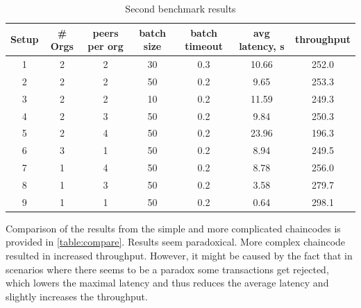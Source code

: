 \begin{table}[h!]
\begin{center}
\begin{tabular}{ c|c|c|c|c|c|c }
  Setup & \# Orgs & peers per org & batch size & batch timeout & avg latency, s & throughput \\
 \hline
 \hline
 1 & 2 & 2 & 30 & 0.3 & 10.66 & 252.0 \\
 \hline
 2 & 2 & 2 & 50 & 0.2 & 9.65 & 253.3 \\
 \hline
 3 & 2 & 2 & 10 & 0.2 & 11.59 & 249.3 \\
 \hline
 4 & 2 & 3 & 50 & 0.2 & 9.84 & 250.3 \\
 \hline
 5 & 2 & 4 & 50 & 0.2 & 23.96 & 196.3 \\
 \hline
 6 & 3 & 1 & 50 & 0.2 & 8.94 & 249.5 \\
 \hline
 7 & 1 & 4 & 50 & 0.2 & 8.78 & 256.0 \\
 \hline
 8 & 1 & 3 & 50 & 0.2 & 3.58 & 279.7 \\
 \hline
 9 & 1 & 1 & 50 & 0.2 & 0.64 & 298.1 \\
 \hline
\end{tabular}
\end{center}
\caption{Second benchmark results}
\label{table:results2}
\end{table}

Comparison of the results from the simple and more complicated chaincodes is provided in \ref{table:compare}. Results seem paradoxical. More complex chaincode resulted in increased throughput. However, it might be caused by the fact that in scenarios where there seems to be a paradox some transactions get rejected, which lowers the maximal latency and thus reduces the average latency and slightly increases the throughput.

